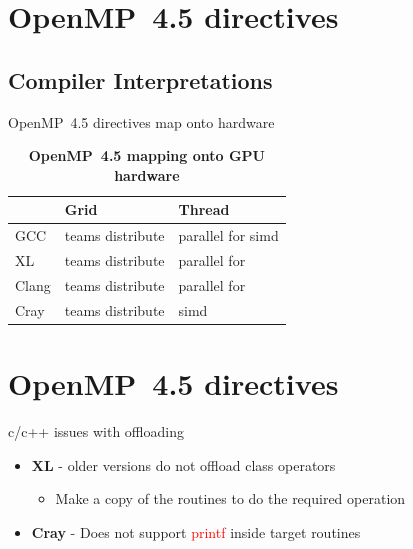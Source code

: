 \documentclass[xcolor=dvipsnames,compress,10pt]{nersc}
\begin{document}

\section{OpenMP~4.5 directives}
\subsection{Compiler Interpretations}
\begin{frame}{OpenMP~4.5 directives map onto hardware}

\begin{table}[htpb]
\begin{tabular}{|l|l|l|}
\hline
{} & {\bfseries Grid} &{\bfseries Thread} \\
\hline
{GCC} & teams distribute & parallel for simd\\
\hline
{XL} & teams distribute & parallel for \\
\hline
{Clang} & teams distribute & parallel for \\
\hline
{Cray} & teams distribute & simd \\
\hline
\end{tabular}
\caption{\bfseries{OpenMP~4.5 mapping onto GPU hardware}}
\end{table}
\end{frame}

\section{OpenMP~4.5 directives}
\begin{frame}{c/c++ issues with offloading}
\begin{itemize}
    \setlength\itemsep{1.5em}
    \item \textbf{XL} - older versions do not offload class operators
    \begin{itemize}
        \item Make a copy of the routines to do the required operation
    \end{itemize}
    \item \textbf{Cray} - Does not support \textcolor{red}{printf} inside target routines
\end{itemize}
\end{frame}
\end{document}
